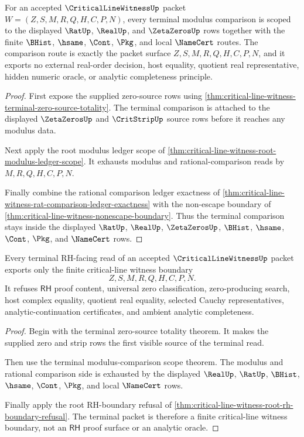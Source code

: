 \begin{theorem}
\label{thm:critical-line-witness-terminal-modulus-comparison-scope}
For an accepted $\CriticalLineWitnessUp$ packet $W=(Z,S,M,R,Q,H,C,P,N)$, every terminal modulus comparison is scoped to the displayed $\RatUp$, $\RealUp$, and $\ZetaZerosUp$ rows together with the finite $\BHist$, $\hsame$, $\Cont$, $\Pkg$, and local $\NameCert$ routes. The comparison route is exactly the packet surface $Z,S,M,R,Q,H,C,P,N$, and it exports no external real-order decision, host equality, quotient real representative, hidden numeric oracle, or analytic completeness principle.
\end{theorem}
\begin{proof}
First expose the supplied zero-source rows using \autoref{thm:critical-line-witness-terminal-zero-source-totality}. The terminal comparison is attached to the displayed $\ZetaZerosUp$ and $\CritStripUp$ source rows before it reaches any modulus data.

Next apply the root modulus ledger scope of \autoref{thm:critical-line-witness-root-modulus-ledger-scope}. It exhausts modulus and rational-comparison reads by $M,R,Q,H,C,P,N$.

Finally combine the rational comparison ledger exactness of \autoref{thm:critical-line-witness-rat-comparison-ledger-exactness} with the non-escape boundary of \autoref{thm:critical-line-witness-nonescape-boundary}. Thus the terminal comparison stays inside the displayed $\RatUp$, $\RealUp$, $\ZetaZerosUp$, $\BHist$, $\hsame$, $\Cont$, $\Pkg$, and $\NameCert$ rows.
\end{proof}

\begin{theorem}
\label{thm:critical-line-witness-terminal-rh-refusal-exactness}
Every terminal RH-facing read of an accepted $\CriticalLineWitnessUp$ packet exports only the finite critical-line witness boundary
$$
Z,S,M,R,Q,H,C,P,N.
$$
It refuses $\mathsf{RH}$ proof content, universal zero classification, zero-producing search, host complex equality, quotient real equality, selected Cauchy representatives, analytic-continuation certificates, and ambient analytic completeness.
\end{theorem}
\begin{proof}
Begin with the terminal zero-source totality theorem. It makes the supplied zero and strip rows the first visible source of the terminal read.

Then use the terminal modulus-comparison scope theorem. The modulus and rational comparison side is exhausted by the displayed $\RealUp$, $\RatUp$, $\BHist$, $\hsame$, $\Cont$, $\Pkg$, and local $\NameCert$ rows.

Finally apply the root RH-boundary refusal of \autoref{thm:critical-line-witness-root-rh-boundary-refusal}. The terminal packet is therefore a finite critical-line witness boundary, not an $\mathsf{RH}$ proof surface or an analytic oracle.
\end{proof}
